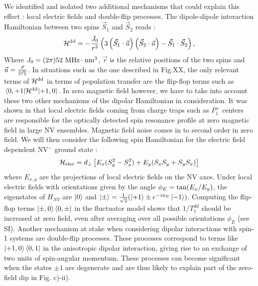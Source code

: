 \documentclass[preprintnumbers,amsmath,amssymb,superscriptaddress,twocolumn,showpacs]{revtex4-2}
\begin{document}
We identified and isolated two additional mechanisms that could explain this effect : local electric fields and double-flip processes. 
The dipole-dipole interaction Hamiltonian between two spins ${\vec S}_1$ and ${\vec S}_2$ reads :
\begin{equation}
\mathcal{H}^{\rm dd}= -\frac{J_0}{r^3}\left(3\left({\vec S}_1 \cdot \vec u \right)\left({\vec S}_2 \cdot \vec u \right) - {\vec S}_1 \cdot {\vec S}_2  \right),
\end{equation}
Where $J_0= (2 \pi) 52\ \rm MHz \cdot \rm{nm}^3$, $\vec r$ is the relative positions of the two spins and $\vec u = \frac{\vec r}{\norm{\vec r}}$. In situations such as the one described in Fig.XX, the only relevant terms of $\mathcal{H}^{\rm dd}$ in terms of population transfer are the flip-flop terms such as $\mel{0,+1}{\mathcal{H}^{\rm dd}}{+1,0}$. In zero magnetic field however, we have to take into account these two other mechanisms of the dipolar Hamiltonian in consideration.
It was shown in  \cite{mittiga2018imaging} that local electric fields coming from charge traps such as $P_1^+$ centers are responsible for the optically detected spin resonance profile at zero magnetic field in large NV ensembles. Magnetic field noise comes in to second order in zero field. %
We will then consider the following spin Hamiltonian for the electric field dependent NV$^-$ ground state : 
\begin{equation}
\label{NV Hamiltonian}
\mathcal{H}_{\rm elec}= d_\perp \left[ E_x(S_y^2-S_x^2) + E_y(S_xS_y+S_yS_x) \right]
\end{equation}
where $E_{x,y}$ are the projections of local electric fields on the NV axes. 
Under local electric fields with orientations given by the angle $\phi_E={\rm tan}(E_x/E_y)$, the eigenstates of $H_{NV}$ are $\ket{0}$ and $\ket{\pm}=\frac{1}{\sqrt{2}}(\ket{+1}\pm e^{-i\phi_E}\ket{-1})$.
Computing the flip-flop terms $\ket{\pm,0} \bra{0,\pm} $ in the fluctuator model shows that $1/T_1^{dd}$ should be increased at zero field, even after averaging over all possible orientations $\phi_E$ (see SI).  Another mechanism at stake when considering dipolar interactions with spin-1 systems are double-flip processes. 
These processes correspond to terms like $\ket{+1,0} \bra{0,1}$ in the anisotropic dipolar interaction, giving rise to an exchange of two units of spin-angular momentum. These processes can become significant when the states $\pm 1$ are degenerate and are thus likely to explain part of the zero-field dip in Fig. c)-ii). 
\end{document}
